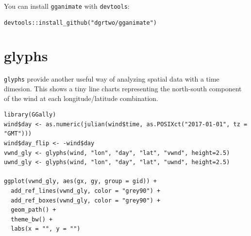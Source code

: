 \documentclass[]{book}
\newenvironment{Shaded}{\begin{snugshade}}{\end{snugshade}}
\newcommand{\KeywordTok}[1]{\textcolor[rgb]{0.13,0.29,0.53}{\textbf{{#1}}}}
\newcommand{\DataTypeTok}[1]{\textcolor[rgb]{0.13,0.29,0.53}{{#1}}}
\newcommand{\DecValTok}[1]{\textcolor[rgb]{0.00,0.00,0.81}{{#1}}}
\newcommand{\StringTok}[1]{\textcolor[rgb]{0.31,0.60,0.02}{{#1}}}
\newcommand{\OtherTok}[1]{\textcolor[rgb]{0.56,0.35,0.01}{{#1}}}
\newcommand{\NormalTok}[1]{{#1}}
\theoremstyle{definition}
\theoremstyle{definition}
\theoremstyle{remark}
\begin{document}
You can install \texttt{gganimate} with \texttt{devtools}:

\begin{verbatim}
devtools::install_github("dgrtwo/gganimate")
\end{verbatim}

\begin{Shaded}
\end{Shaded}

\section{glyphs}\label{glyphs}

\texttt{glyphs} provide another useful way of analyzing spatial data
with a time dimesion. This shows a tiny line charts representing the
north-south component of the wind at each longitude/latitude
combination.

\begin{verbatim}
library(GGally)
wind$day <- as.numeric(julian(wind$time, as.POSIXct("2017-01-01", tz = "GMT")))
wind$day_flip <- -wind$day
vwnd_gly <- glyphs(wind, "lon", "day", "lat", "vwnd", height=2.5)
uwnd_gly <- glyphs(wind, "lon", "day", "lat", "uwnd", height=2.5)

ggplot(vwnd_gly, aes(gx, gy, group = gid)) +
  add_ref_lines(vwnd_gly, color = "grey90") +
  add_ref_boxes(vwnd_gly, color = "grey90") +
  geom_path() +
  theme_bw() +
  labs(x = "", y = "")
\end{verbatim}
\end{document}
